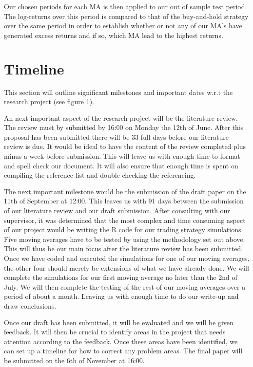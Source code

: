 \documentclass[12pt]{article}
\begin{document}
Our chosen periods for each MA is then applied to our out of sample test period. The log-returns over this period is compared to that of the buy-and-hold strategy over the same period in order to establish whether or not any of our MA's have generated excess returns and if so, which MA lead to the highest returns. 

\section{Timeline }

This section will outline significant milestones and important dates w.r.t the research project (see figure 1). 

An next important aspect of the research project will be the literature review. The review must by submitted by 16:00 on Monday the 12th of June. After this proposal has been submitted there will be 33 full days before our literature review is due. It would be ideal to have the content of the review completed plus minus a week before submission. This will leave us with enough time to format and spell check our document. It will also ensure that enough time is spent on compiling the reference list and double checking the referencing. 

The next important milestone would be the submission of the draft paper on the 11th of September at 12:00. This leaves us with 91 days between the submission of our literature review and our draft submission. After consulting with our supervisor, it was determined that the most complex and time consuming aspect of our project would be writing the R code for our trading strategy simulations. Five moving averages have to be tested by using the methodology set out above. This will thus be our main focus after the literature review has been submitted. Once we have coded and executed the simulations for one of our moving averages, the other four should merely be extensions of what we have already done. We will complete the simulations for our first moving average no later than the  2nd of July. We will then complete the testing of the rest of our moving averages over a period of about a month. Leaving us with enough time to do our write-up and draw conclusions. 

Once our draft has been submitted, it will be evaluated and we will be given feedback. It will then be crucial to identify areas in the project that needs attention according to the feedback. Once these areas have been identified, we can set up a timeline for how to correct any problem areas. The final paper will be submitted on the 6th of November at 16:00. 
\end{document}

